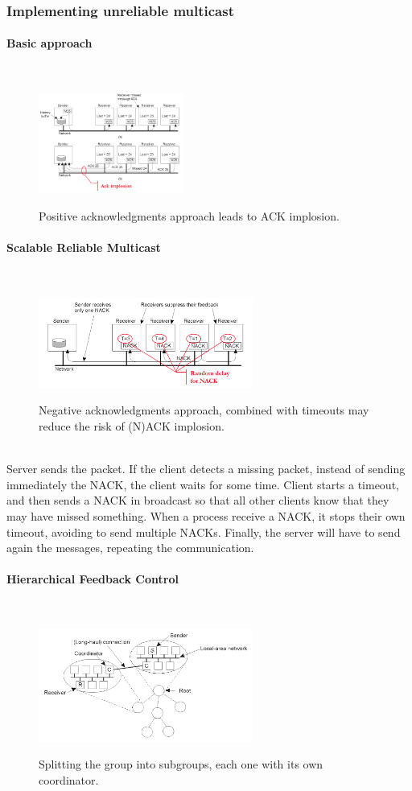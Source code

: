 \documentclass[10pt,a4paper]{article}
\newcommand{\myparagraph}[1]{\paragraph{#1}\mbox{}\\[0.05in]}
\begin{document}
\subsubsection{Implementing unreliable multicast}
\myparagraph{Basic approach}
\begin{figure}[h!]
\hfill \includegraphics[width=135pt]{images/non-faulty-basic.png}\hspace*{\fill}
  \label{fig:non-faulty-basic}
  \caption{Positive acknowledgments approach leads to ACK implosion.}
\end{figure}
\myparagraph{Scalable Reliable Multicast}
\begin{figure}[h!]
\hfill \includegraphics[width=200pt]{images/non-faulty-rel-mult.png}\hspace*{\fill}
  \label{fig:non-faulty-rel-mult}
  \caption{Negative acknowledgments approach, combined with timeouts may reduce the risk of (N)ACK implosion.}
\end{figure} \\
Server sends the packet. If the client detects a missing packet, instead of sending immediately the NACK, the client waits for some time. Client starts a timeout, and then sends a NACK in broadcast so that all other clients know that they may have missed something. When a process receive a NACK, it stops their own timeout, avoiding to send multiple NACKs. Finally, the server will have to send again the messages, repeating the communication.
\myparagraph{Hierarchical Feedback Control}
\begin{figure}[h!]
\hfill \includegraphics[width=200pt]{images/non-faulty-hierarchical.png}\hspace*{\fill}
  \label{fig:non-faulty-hierarchical}
  \caption{Splitting the group into subgroups, each one with its own coordinator.}
\end{figure} \\
\end{document}
